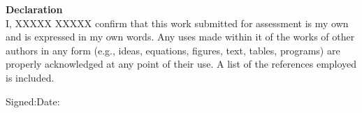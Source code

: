 {\Large\textbf{Declaration}}\\

I, XXXXX XXXXX confirm that this work submitted for assessment is my own and is expressed in my own words. Any uses made within it of the works of other authors in any form (e.g., ideas, equations, figures, text, tables, programs) are properly acknowledged at any point of their use. A list of the references employed is included.

\vspace{3cm}

Signed:\hfill Date:\hspace{5cm}